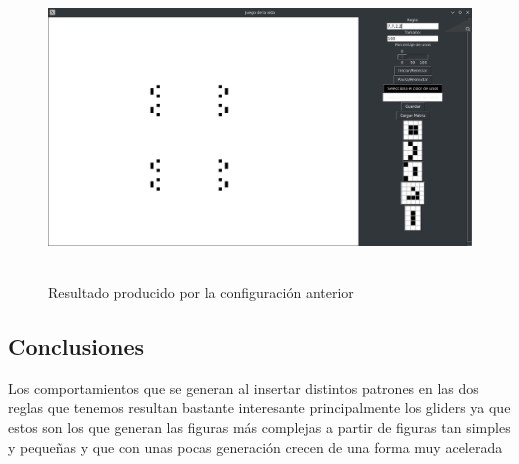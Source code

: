 \begin{figure}[H]
\begin{center}
 \includegraphics[width=12cm, height=8cm]{./img/final2.png}
 \caption{Resultado producido por la configuración anterior}
 \label{fig:final2}
\end{center}
\end{figure}

\subsection{Conclusiones}
Los comportamientos que se generan al insertar distintos patrones en las dos reglas que tenemos resultan bastante interesante principalmente los gliders ya que estos son los que generan las figuras más complejas a partir de figuras tan simples y pequeñas y que con unas pocas generación crecen de una forma muy acelerada

